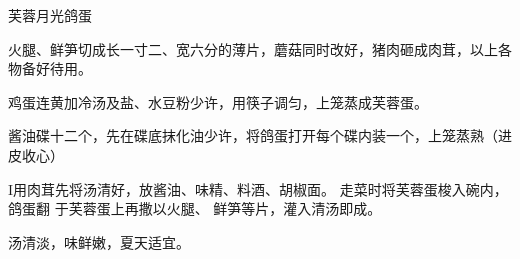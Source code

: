 \begin{recipe}{芙蓉月光鸽蛋}

\ingredients


\cooking

\step 火腿、鲜笋切成长一寸二、宽六分的薄片，蘑菇同时改好，猪肉砸成肉茸，以上各
物备好待用。

\step 鸡蛋连黄加冷汤及盐、水豆粉少许，用筷子调匀，上笼蒸成芙蓉蛋。

\step 酱油碟十二个，先在碟底抹化油少许，将鸽蛋打开每个碟内装一个，上笼蒸熟（进
皮收心）

I用肉茸先将汤清好，放酱油、味精、料酒、胡椒面。 走菜时将芙蓉蛋梭入碗内，鸽蛋翻
于芙蓉蛋上再撒以火腿、 鲜笋等片，灌入清汤即成。

\features

汤清淡，味鲜嫩，夏天适宜。

\end{recipe}

